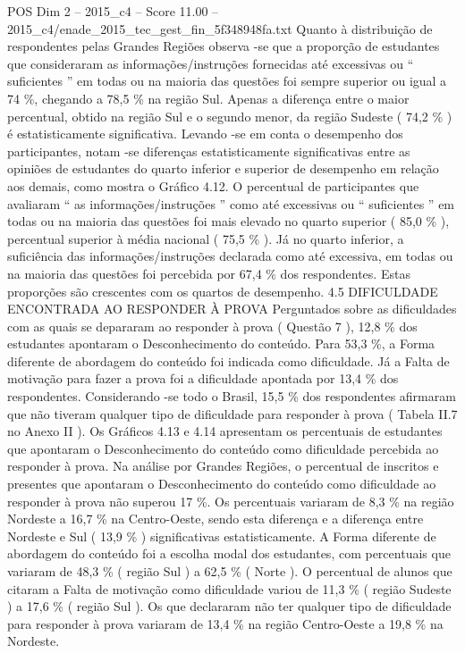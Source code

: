 \begin{textsample}{POS Dim 2 – 2015\_c4 – Score 11.00 – 2015\_c4/enade\_2015\_tec\_gest\_fin\_5f348948fa.txt}
Quanto à distribuição de respondentes pelas Grandes Regiões observa -se que a proporção de estudantes que consideraram as informações/instruções fornecidas até excessivas ou “ suficientes ” em todas ou na maioria das questões foi sempre superior ou igual a 74 \%, chegando a 78,5 \% na região Sul.
Apenas a diferença entre o maior percentual, obtido na região Sul e o segundo menor, da região Sudeste ( 74,2 \% ) é estatisticamente significativa.
Levando -se em conta o desempenho dos participantes, notam -se diferenças estatisticamente significativas entre as opiniões de estudantes do quarto inferior e superior de desempenho em relação aos demais, como mostra o Gráfico 4.12.
O percentual de participantes que avaliaram “ as informações/instruções ” como até excessivas ou “ suficientes ” em todas ou na maioria das questões foi mais elevado no quarto superior ( 85,0 \% ), percentual superior à média nacional ( 75,5 \% ).
Já no quarto inferior, a suficiência das informações/instruções declarada como até excessiva, em todas ou na maioria das questões foi percebida por 67,4 \% dos respondentes.
Estas proporções são crescentes com os quartos de desempenho. 4.5 DIFICULDADE ENCONTRADA AO RESPONDER À PROVA Perguntados sobre as dificuldades com as quais se depararam ao responder à prova ( Questão 7 ), 12,8 \% dos estudantes apontaram o Desconhecimento do conteúdo.
Para 53,3 \%, a Forma diferente de abordagem do conteúdo foi indicada como dificuldade.
Já a Falta de motivação para fazer a prova foi a dificuldade apontada por 13,4 \% dos respondentes.
Considerando -se todo o Brasil, 15,5 \% dos respondentes afirmaram que não tiveram qualquer tipo de dificuldade para responder à prova ( Tabela II.7 no Anexo II ).
Os Gráficos 4.13 e 4.14 apresentam os percentuais de estudantes que apontaram o Desconhecimento do conteúdo como dificuldade percebida ao responder à prova.
Na análise por Grandes Regiões, o percentual de inscritos e presentes que apontaram o Desconhecimento do conteúdo como dificuldade ao responder à prova não superou 17 \%.
Os percentuais variaram de 8,3 \% na região Nordeste a 16,7 \% na Centro-Oeste, sendo esta diferença e a diferença entre Nordeste e Sul ( 13,9 \% ) significativas estatisticamente.
A Forma diferente de abordagem do conteúdo foi a escolha modal dos estudantes, com percentuais que variaram de 48,3 \% ( região Sul ) a 62,5 \% ( Norte ).
O percentual de alunos que citaram a Falta de motivação como dificuldade variou de 11,3 \% ( região Sudeste ) a 17,6 \% ( região Sul ).
Os que declararam não ter qualquer tipo de dificuldade para responder à prova variaram de 13,4 \% na região Centro-Oeste a 19,8 \% na Nordeste.

\end{textsample}
